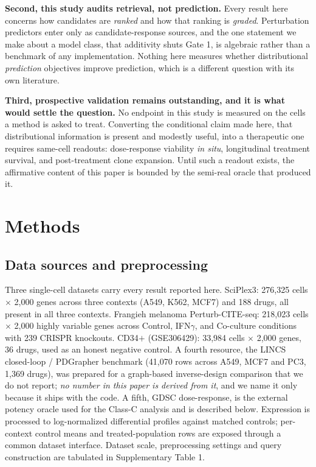 \documentclass[11pt,letterpaper]{article}
\begin{document}
\textbf{Second, this study audits retrieval, not prediction.} Every result here concerns how
candidates are \emph{ranked} and how that ranking is \emph{graded}. Perturbation predictors enter
only as candidate-response sources, and the one statement we make about a model class, that
additivity shuts Gate 1, is algebraic rather than a benchmark of any implementation. Nothing here
measures whether distributional \emph{prediction} objectives improve prediction, which is a
different question with its own literature\cite{CellOT,Departures,CellFlow}.

\textbf{Third, prospective validation remains outstanding, and it is what would settle the
question.} No endpoint in this study is measured on the cells a method is asked to treat.
Converting the conditional claim made here, that distributional information is present and modestly
useful, into a therapeutic one requires same-cell readouts: dose-response viability \emph{in situ},
longitudinal treatment survival, and post-treatment clone expansion. Until such a readout exists,
the affirmative content of this paper is bounded by the semi-real oracle that produced it.

\section*{Methods}

\subsection*{Data sources and preprocessing}

Three single-cell datasets carry every result reported here. SciPlex3\cite{dataSciPlex3}: 276,325 cells $\times$ 2,000 genes across three contexts (A549, K562, MCF7) and 188
drugs, all present in all three contexts. Frangieh melanoma Perturb-CITE-seq\cite{dataFrangieh}: 218,023 cells $\times$ 2,000 highly variable genes across Control,
IFN$\gamma$, and Co-culture conditions with 239 CRISPR knockouts. CD34$+$
(GSE306429)\cite{dataCD34}: 33,984 cells $\times$ 2,000 genes, 36 drugs, used as an honest negative
control. A fourth resource, the LINCS closed-loop / PDGrapher benchmark (41,070 rows
across A549, MCF7 and PC3, 1,369 drugs), was prepared for a graph-based inverse-design comparison
that we do not report; \emph{no number in this paper is derived from it}, and we name it only
because it ships with the code. A fifth, GDSC dose-response, is the external potency oracle used
for the Class-C analysis and is described below. Expression is processed to log-normalized
differential profiles against matched controls; per-context control means and treated-population
rows are exposed through a common dataset interface. Dataset scale, preprocessing settings and query
construction are tabulated in Supplementary Table 1.
\end{document}
